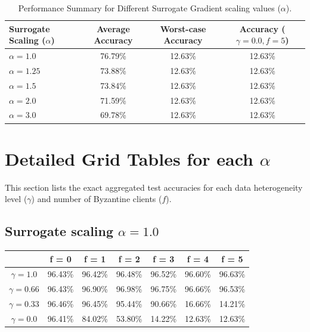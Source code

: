 \documentclass{article}
\begin{document}
\begin{table}[htbp]
    \centering
    \caption{Performance Summary for Different Surrogate Gradient scaling values ($\alpha$).}
    \label{tab:summary}
    \begin{tabular}{lccc}
        \toprule
        \textbf{Surrogate Scaling ($\alpha$)} & \textbf{Average Accuracy} & \textbf{Worst-case Accuracy} & \textbf{Accuracy ($\gamma=0.0, f=5$)} \\
        \midrule
        $\alpha = 1.0$ & 76.79\% & 12.63\% & 12.63\% \\
        $\alpha = 1.25$ & 73.88\% & 12.63\% & 12.63\% \\
        $\alpha = 1.5$ & 73.84\% & 12.63\% & 12.63\% \\
        $\alpha = 2.0$ & 71.59\% & 12.63\% & 12.63\% \\
        $\alpha = 3.0$ & 69.78\% & 12.63\% & 12.63\% \\
        \bottomrule
    \end{tabular}
\end{table}

\section{Detailed Grid Tables for each $\alpha$}
This section lists the exact aggregated test accuracies for each data heterogeneity level ($\gamma$) and number of Byzantine clients ($f$).

\subsection{Surrogate scaling $\alpha = 1.0$}
\begin{table}[htbp]
    \centering
    \begin{tabular}{ccccccc}
        \toprule
        & \textbf{f = 0} & \textbf{f = 1} & \textbf{f = 2} & \textbf{f = 3} & \textbf{f = 4} & \textbf{f = 5} \\
        \midrule
        $\gamma = 1.0$ & 96.43\% & 96.42\% & 96.48\% & 96.52\% & 96.60\% & 96.63\% \\
        $\gamma = 0.66$ & 96.43\% & 96.90\% & 96.98\% & 96.75\% & 96.66\% & 96.53\% \\
        $\gamma = 0.33$ & 96.46\% & 96.45\% & 95.44\% & 90.66\% & 16.66\% & 14.21\% \\
        $\gamma = 0.0$ & 96.41\% & 84.02\% & 53.80\% & 14.22\% & 12.63\% & 12.63\% \\
        \bottomrule
    \end{tabular}
\end{table}
\end{document}
